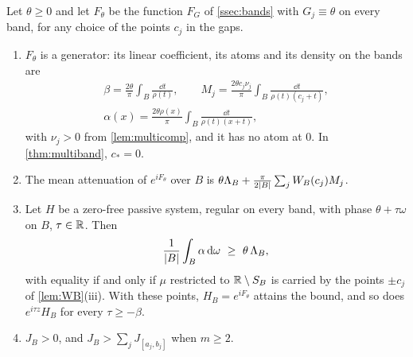 \begin{theorem}\label{thm:severalbands}
Let $\theta\ge0$ and let $F_\theta$ be the function $F_G$ of
\cref{ssec:bands} with $G_j\equiv\theta$ on every band, for any choice of
the points $c_j$ in the gaps.
\begin{enumerate}
\item[(i)] $F_\theta$ is a generator: its linear coefficient, its atoms and
its density on the bands are
\begin{gather*}
\beta=\frac{2\theta}\pi\int_B\frac{\dd t}{\rho(t)},\qquad
M_j=\frac{2\theta c_j\nu_j}\pi\int_B\frac{\dd t}{\rho(t)(c_j+t)},\\
\alpha(x)=\frac{2\theta\rho(x)}\pi\int_B\frac{\dd t}{\rho(t)(x+t)},
\end{gather*}
with $\nu_j>0$ from \cref{lem:multicomp}, and it has no atom at $0$. In
\cref{thm:multiband}, $c_*=0$.
\item[(ii)] The mean attenuation of $e^{iF_\theta}$ over $B$ is
$\theta\Lambda_B+\frac\pi{2\left|B\right|}\sum_jW_B(c_j)M_j$.
\item[(iii)] Let $H$ be a zero-free passive system, regular on every band,
with phase $\theta+\tau\omega$ on $B$, $\tau\in\mathbb R$. Then
\[
\frac1{\abs B}\int_B\alpha\dd\omega\ \ge\ \theta\,\Lambda_B ,
\]
with equality if and only if $\mu$ restricted to $\mathbb R\setminus S_B$ is
carried by the points $\pm c_j$ of \cref{lem:WB}(iii). With these points,
$H_B=e^{iF_\theta}$ attains the bound, and so does $e^{i\tau z}H_B$ for every
$\tau\ge-\beta$.
\item[(iv)] $J_B>0$, and $J_B>\sum_jJ_{[a_j,b_j]}$ when $m\ge2$.
\end{enumerate}
\end{theorem}

